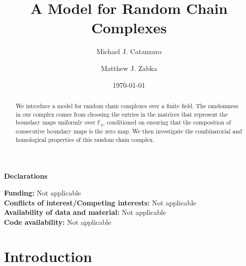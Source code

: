 \documentclass [smallcondensed, referee] {svjour3}
\begin{document}
\title{A Model for Random Chain Complexes}
\author{Michael J. Catanzaro \and Matthew J. Zabka}
\date{\today}



\maketitle

\begin{abstract}
We introduce a model for random chain complexes over a finite
field. The randomness in our complex comes from choosing the entries in the
matrices that represent the boundary maps uniformly over $\mathbb{F}_q$,
conditioned on ensuring that the composition of consecutive boundary maps is
the zero map.  We then investigate the combinatorial and homological 
properties of this random chain complex.
\end{abstract}


\maketitle


\begin{center}
    \textbf{Declarations} 
\end{center}

\textbf{Funding:} Not applicable\\

\textbf{Conflicts of interest/Competing interests:} Not applicable\\

\textbf{Availability of data and material:} Not applicable\\

\textbf{Code availability:} Not applicable\\

\newpage

\section{Introduction}

\end{document}

